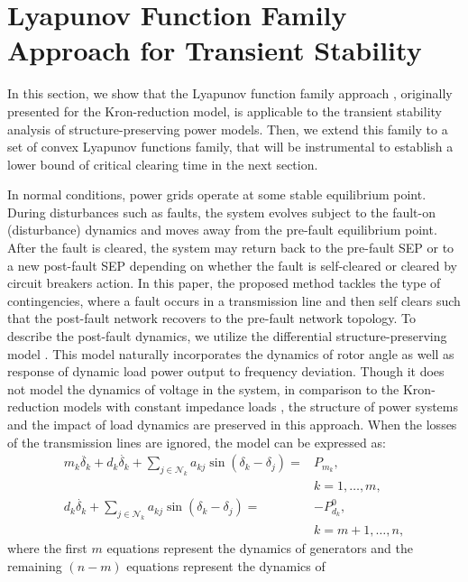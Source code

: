 \documentclass[final]{IEEEtran}
\begin{document}
\section{Lyapunov Function Family Approach for Transient Stability}
\label{sec:LFF}

In this section, we show that the Lyapunov function family
approach \cite{Vu:2014}, originally presented for the
Kron-reduction model, is applicable to the transient stability
analysis of structure-preserving power models. Then, we extend
this family to a set of convex Lyapunov functions family, that
will be instrumental to establish a lower bound of critical
clearing time in the next section.

In normal conditions, power grids operate at some stable
equilibrium point. During disturbances such as faults, the system
evolves subject to the fault-on (disturbance) dynamics and moves
away from the pre-fault equilibrium point.  After the fault is
cleared, the system may return back to the pre-fault SEP or to a
new post-fault SEP depending on whether the fault is self-cleared
or cleared by circuit breakers action. In this paper, the proposed
method tackles the type of contingencies, where a fault occurs in
a transmission line and then self clears such that the post-fault
network recovers to the pre-fault network topology. To describe
the  post-fault dynamics, we utilize the differential
structure-preserving model \cite{bergen1981structure}. This model
naturally incorporates the dynamics of rotor angle as well as
response of dynamic load power output to frequency deviation.
Though it does not model the dynamics of voltage in the system, in
comparison to the Kron-reduction models with constant impedance
loads \cite{386159}, the structure of power systems and the impact
of load dynamics are preserved in this approach. When the losses
of the transmission lines are ignored, the model can be expressed
as:
\begin{align}
\label{eq.structure-preserving}
 m_k \ddot{\delta_k} + d_k \dot{\delta_k} + \sum_{j \in
  \mathcal{N}_k} a_{kj} \sin(\delta_k-\delta_j) = &P_{m_k},  \\
  &k=1,\dots,m,  \nonumber\\
  \label{eq.structure-preserving2}
  d_k \dot{\delta_k} + \sum_{j \in
  \mathcal{N}_k} a_{kj} \sin(\delta_k-\delta_j) = &-P^0_{d_k},  \\
  & k=m+1,\dots,n, \nonumber
\end{align}
where the first $m$ equations represent the dynamics of generators
and the remaining $(n-m)$ equations represent the dynamics of
\end{document}
